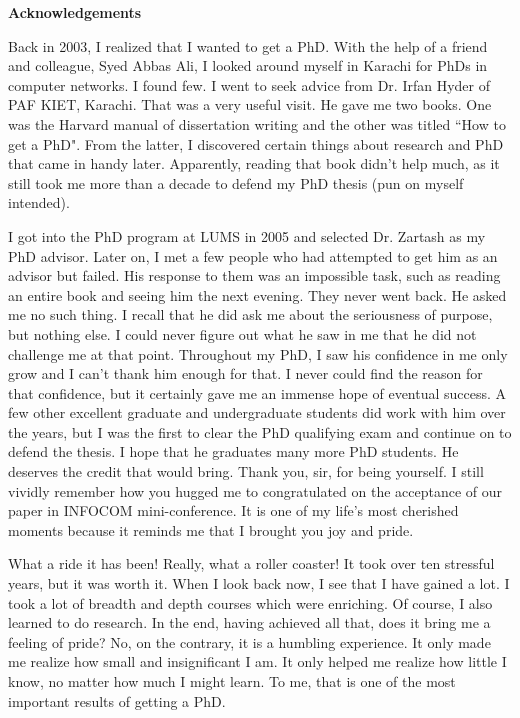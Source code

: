 \newpage
\thispagestyle{empty}
\begin{center}
  \vspace*{1cm}
  \textbf{\large Acknowledgements}
\end{center}

Back in 2003, I realized that I wanted to get a PhD. With the help of a friend and colleague, Syed Abbas Ali, I looked around myself in Karachi for PhDs in computer networks. I found few. I went to seek advice from Dr. Irfan Hyder of PAF KIET, Karachi. That was a very useful visit. He gave me two books. One was the Harvard manual of dissertation writing and the other was titled ``How to get a PhD". From the latter, I discovered certain things about research and PhD that came in handy later. Apparently, reading that book didn't help much, as it still took me more than a decade to defend my PhD thesis (pun on myself intended).


I got into the PhD program at LUMS in 2005 and selected Dr. Zartash as my PhD advisor. Later on, I met a few people who had attempted to get him as an advisor but failed. His response to them was an impossible task, such as reading an entire book and seeing him the next evening. They never went back. He asked me no such thing. I recall that he did ask me about the seriousness of purpose, but nothing else. I could never figure out what he saw in me that he did not challenge me at that point. Throughout my PhD, I saw his confidence in me only grow and I can't thank him enough for that. I never could find the reason for that confidence, but it certainly gave me an immense hope of eventual success. A few other excellent graduate and undergraduate students did work with him over the years, but I was the first to clear the PhD qualifying exam and continue on to defend the thesis. I hope that he graduates many more PhD students. He deserves the credit that would bring. Thank you, sir, for being yourself. I still vividly remember how you hugged me to congratulated on the acceptance of our paper in INFOCOM mini-conference. It is one of my life's most cherished moments because it reminds me that I brought you joy and pride. 


What a ride it has been! Really, what a roller coaster! It took over ten stressful years, but it was worth it. When I look back now, I see that I have gained a lot. I took a lot of breadth and depth courses which were enriching. Of course, I also learned to do research. In the end, having achieved all that, does it bring me a feeling of pride? No, on the contrary, it is a humbling experience. It only made me realize how small and insignificant I am. It only helped me realize how little I know, no matter how much I might learn. To me, that is one of the most important results of getting a PhD.


